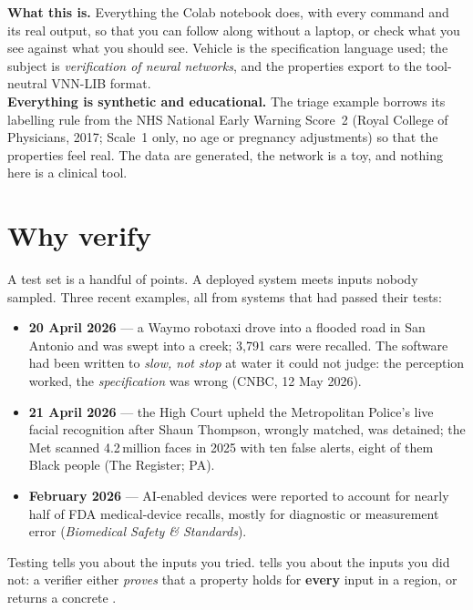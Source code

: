 \documentclass[11pt]{article}
\begin{document}

\begin{notebox}
\textbf{What this is.} Everything the Colab notebook does, with every command and its real output, so that you can follow
along without a laptop, or check what you see against what you should see. Vehicle is the specification language
used; the subject is \emph{verification of neural networks}, and the properties export to the tool-neutral VNN-LIB format.\\[1mm]
\textbf{Everything is synthetic and educational.} The triage example borrows its labelling rule from the NHS National
Early Warning Score~2 (Royal College of Physicians, 2017; Scale~1 only, no age or pregnancy adjustments) so that the
properties feel real. The data are generated, the network is a toy, and nothing here is a clinical tool.
\end{notebox}

\section{Why verify}
A test set is a handful of points. A deployed system meets inputs nobody sampled. Three recent examples, all from
systems that had passed their tests:
\begin{itemize}
  \item \textbf{20 April 2026} — a Waymo robotaxi drove into a flooded road in San Antonio and was swept into a creek; 3,791 cars were recalled. The software had been written to \emph{slow, not stop} at water it could not judge: the perception worked, the \emph{specification} was wrong (CNBC, 12 May 2026).
  \item \textbf{21 April 2026} — the High Court upheld the Metropolitan Police's live facial recognition after Shaun Thompson, wrongly matched, was detained; the Met scanned 4.2\,million faces in 2025 with ten false alerts, eight of them Black people (The Register; PA).
  \item \textbf{February 2026} — AI-enabled devices were reported to account for nearly half of FDA medical-device recalls, mostly for diagnostic or measurement error (\emph{Biomedical Safety \& Standards}).
\end{itemize}
Testing tells you about the inputs you tried.  tells you about the inputs you did not: a verifier
either \emph{proves} that a property holds for \textbf{every} input in a region, or returns a concrete
.
\end{document}

